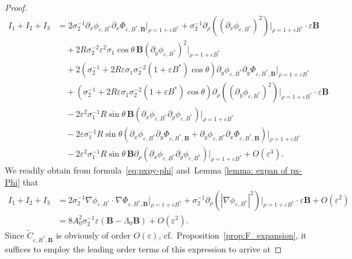 \documentclass[12pt,reqno]{amsart}
\numberwithin{equation}{section}
\theoremstyle{definition}
\theoremstyle{remark}
\begin{document}
\begin{proof}
\begin{equation}
\begin{split}
I_1+I_2+I_3 
&=2 \sigma_2^{-1} 
\partial_x\phi_{\varepsilon,B^*} \partial_x\Phi_{\varepsilon,B^*,  \textbf{B}}\big|_{\rho=1+\varepsilon B^*}  + \sigma_2^{-1} 
\partial_\rho\left ((\partial_x\phi_{\varepsilon,B^*})^2\right )\big|_{\rho=1+\varepsilon B^*}\cdot \varepsilon  \textbf{B} \\
&\quad +2R\sigma_2^{-2}\varepsilon^2\sigma_1\cos\theta\, \textbf{B}\left (\partial_y\phi_{\varepsilon,B^*}\right )^2\big|_{\rho=1+\varepsilon B^*} \\
&\quad +2\left (\sigma_2^{-1}+2R\varepsilon\sigma_1\sigma_2^{-2}(1+\varepsilon B^*)\cos\theta\right )
\partial_y\phi_{\varepsilon,B^*}\partial_y\Phi_{\varepsilon,B^*,  \textbf{B}}\big|_{\rho=1+\varepsilon B^*} \\
&\quad +\left (\sigma_2^{-1}+2R\varepsilon\sigma_1\sigma_2^{-2}(1+\varepsilon B^*)\cos\theta\right )
\partial_\rho\left ((\partial_y\phi_{\varepsilon,B^*})^2\right )\big|_{\rho=1+\varepsilon B^*}\cdot\varepsilon  \textbf{B} \\
&\quad -2\varepsilon^2\sigma_1^{-1}R\sin\theta\, \textbf{B}\left (\partial_x\phi_{\varepsilon,B^*}\partial_y\phi_{\varepsilon,B^*}\right )\big|_{\rho=1+\varepsilon B^*} \\
&\quad -2\varepsilon\sigma_1^{-1}R\sin\theta
\left(\partial_x\phi_{\varepsilon,B^*}\partial_y\Phi_{\varepsilon,B^*,  \textbf{B}}
+\partial_y\phi_{\varepsilon,B^*}\partial_x\Phi_{\varepsilon,B^*,  \textbf{B}}\right)\big|_{\rho=1+\varepsilon B^*} \\
&\quad -2\varepsilon^2\sigma_1^{-1}R\sin\theta\, \textbf{B}
\partial_\rho(\partial_x\phi_{\varepsilon,B^*}\partial_y\phi_{\varepsilon,B^*})\big|_{\rho=1+\varepsilon B^*} +O\left (\varepsilon^3\right ). 
\end{split}
\end{equation}
We readily obtain from formula~\eqref{eq:pxpy-phi} and~Lemma \ref{lemma: expan of px-Phi} that
\begin{align*}
I_1+I_2+I_3 
&=2\sigma_2^{-1}\nabla\phi_{\varepsilon,B^*}\cdot\nabla\Phi_{\varepsilon,B^*,
	  \textbf{B}}\big|_{\rho=1+\varepsilon B^*}
+\sigma_2^{-1}\partial_\rho\left(|\nabla\phi_{\varepsilon,B^*}|^2\right)\big|_{\rho=1+\varepsilon B^*}\cdot\varepsilon  \textbf{B}+O(\varepsilon^2) \\
&=8A_0^2\sigma_2^{-1}\varepsilon(  \textbf{B}-\Lambda_0  \textbf{B})+O(\varepsilon^2). 
\end{align*}
Since $\widetilde C_{\varepsilon,B^*,\textbf{B}}$ is obviously of order $O(\varepsilon)$, cf.\ Proposition~\ref{prop:F_expansion}, it suffices to employ the leading order terms of this expression to arrive at

\end{proof}
\end{document}
